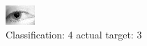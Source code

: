 \begin{figure}[h!]
\begin{center}
\includegraphics[width=0.60\columnwidth]{figures/ID1329_class_4_target_3.png}
\end{center}
\caption{ Classification: 4 actual target: 3}
\label{fig:ID1329_class_4_target_3}
\end{figure}
